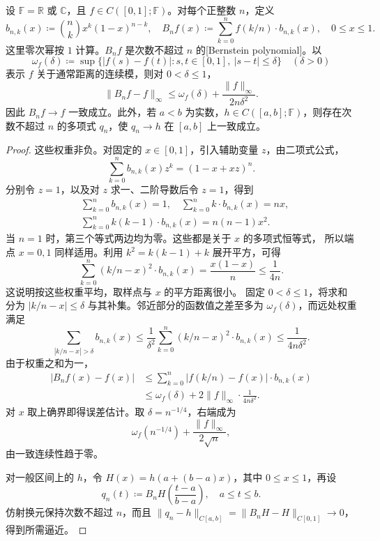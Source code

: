 \begin{theorem}
\label{b2:thm:approximation-bernstein-univariate}
设 \(\mathbb F=\mathbb R\) 或 \(\mathbb C\)，且 \(f\in C([0,1];\mathbb F)\)。对每个正整数 \(n\)，定义
\[
 b_{n,k}(x)\coloneqq\binom nk x^k(1-x)^{n-k},
 \quad
 B_nf(x)\coloneqq\sum_{k=0}^nf(k/n)\cdot b_{n,k}(x),
 \quad 0\leq x\leq1.
\]
这里零次幂按 \(1\) 计算。\(B_nf\) 是次数不超过 \(n\) 的[Bernstein polynomial]。以
\[
 \omega_f(\delta)\coloneqq
 \sup\{|f(s)-f(t)|:s,t\in[0,1],\ |s-t|\leq\delta\}
 \quad(\delta>0)
\]
表示 \(f\) 关于通常距离的连续模，则对 \(0<\delta\leq1\)，
\[
 \lVert B_nf-f\rVert_\infty
 \leq\omega_f(\delta)
      +\frac{\lVert f\rVert_\infty}{2n\delta^2}.
\]
因此 \(B_nf\to f\) 一致成立。此外，若 \(a<b\) 为实数，\(h\in C([a,b];\mathbb F)\)，则存在次数不超过 \(n\) 的多项式 \(q_n\)，使 \(q_n\to h\) 在 \([a,b]\) 上一致成立。
\end{theorem}
\begin{proof}
这些权重非负。对固定的 \(x\in[0,1]\)，引入辅助变量 \(z\)，由二项式公式，
\[
 \sum_{k=0}^n b_{n,k}(x)z^k=(1-x+xz)^n.
\]
分别令 \(z=1\)，以及对 \(z\) 求一、二阶导数后令 \(z=1\)，得到
\[
\begin{aligned}
 &\sum_{k=0}^n b_{n,k}(x)=1,\quad
   \sum_{k=0}^n k\cdot b_{n,k}(x)=nx,\\
 &\sum_{k=0}^n k(k-1)\cdot b_{n,k}(x)=n(n-1)x^2.
\end{aligned}
\]
当 \(n=1\) 时，第三个等式两边均为零。这些都是关于 \(x\) 的多项式恒等式，
所以端点 \(x=0,1\) 同样适用。利用 \(k^2=k(k-1)+k\) 展开平方，可得
\begin{equation}
 \label{b2:eq:approximation-bernstein-variance}
 \sum_{k=0}^n(k/n-x)^2\cdot b_{n,k}(x)
 =\frac{x(1-x)}n\leq\frac1{4n}.
\end{equation}
这说明按这些权重平均，取样点与 \(x\) 的平方距离很小。
固定 \(0<\delta\leq1\)，将求和分为 \(|k/n-x|\leq\delta\) 与其补集。邻近部分的函数值之差至多为 \(\omega_f(\delta)\)，而远处权重满足
\[
 \sum_{|k/n-x|>\delta}b_{n,k}(x)
 \leq\frac1{\delta^2}
       \sum_{k=0}^n(k/n-x)^2\cdot b_{n,k}(x)
 \leq\frac1{4n\delta^2}.
\]
由于权重之和为一，
\[
\begin{aligned}
 |B_nf(x)-f(x)|
 &\leq\sum_{k=0}^n|f(k/n)-f(x)|\cdot b_{n,k}(x)\\
 &\leq\omega_f(\delta)
       +2\lVert f\rVert_\infty\cdot\frac1{4n\delta^2}.
\end{aligned}
\]
对 \(x\) 取上确界即得误差估计。取 \(\delta=n^{-1/4}\)，右端成为
\[
 \omega_f(n^{-1/4})+\frac{\lVert f\rVert_\infty}{2\sqrt n},
\]
由一致连续性趋于零。

对一般区间上的 \(h\)，令 \(H(x)=h(a+(b-a)x)\)，其中 \(0\leq x\leq1\)，再设
\[
 q_n(t)\coloneqq B_nH\!\left(\frac{t-a}{b-a}\right),
 \quad a\leq t\leq b.
\]
仿射换元保持次数不超过 \(n\)，而且
\(\lVert q_n-h\rVert_{C[a,b]}=\lVert B_nH-H\rVert_{C[0,1]}\to0\)，得到所需逼近。
\end{proof}

